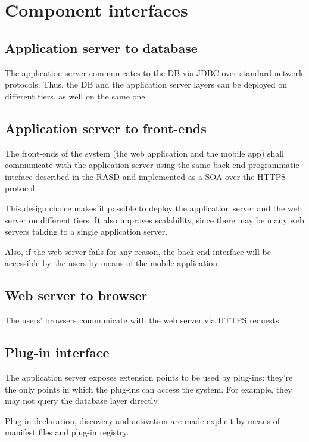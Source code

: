 \section{Component interfaces}
\label{sec:component-interfaces}

\subsection{Application server to database}
The application server communicates to the DB via JDBC over standard network protocols. Thus, the DB and the application server layers can be deployed on different tiers, as well on the same one.

\subsection{Application server to front-ends}
The front-ends of the system (the web application and the mobile app) shall communicate with the application server using the same back-end programmatic inteface described in the RASD and implemented as a SOA over the HTTPS protocol.

This design choice makes it possible to deploy the application server and the web server on different tiers. It also improves scalability, since there may be many web servers talking to a single application server.

Also, if the web server fails for any reason, the back-end interface will be accessible by the users by means of the mobile application.

\subsection{Web server to browser}
The users' browsers communicate with the web server via HTTPS requests.

\subsection{Plug-in interface}
The application server exposes extension points to be used by plug-ins: they're the only points in which the plug-ins can access the system. For example, they may not query the database layer directly.

Plug-in declaration, discovery and activation are made explicit by means of manifest files and plug-in registry.
